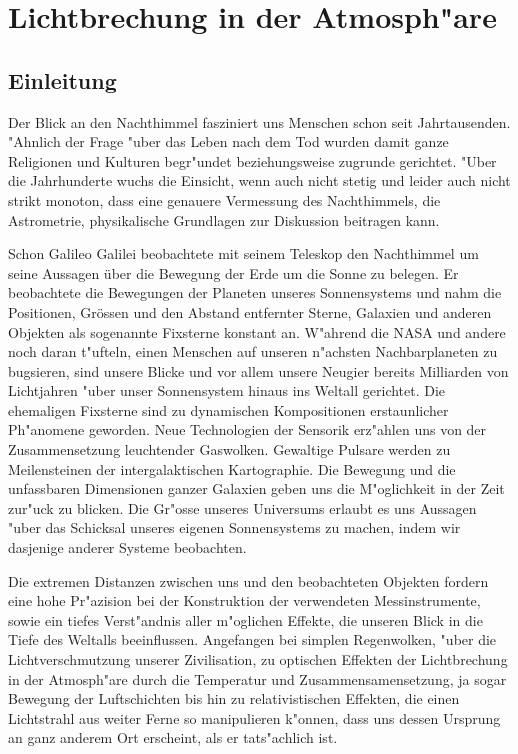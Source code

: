 \chapter{Lichtbrechung in der Atmosph"are\label{chapter:licht}}
\begin{refsection}


\section{Einleitung}

Der Blick an den Nachthimmel fasziniert uns Menschen schon seit Jahrtausenden. "Ahnlich der Frage "uber das Leben nach dem Tod wurden damit ganze Religionen und Kulturen begr"undet beziehungsweise zugrunde gerichtet. 
"Uber die Jahrhunderte wuchs die Einsicht, wenn auch nicht stetig und leider auch nicht strikt monoton, dass eine genauere Vermessung des Nachthimmels, die Astrometrie, physikalische Grundlagen zur Diskussion beitragen kann. 


Schon Galileo Galilei beobachtete mit seinem Teleskop den Nachthimmel um seine Aussagen über die Bewegung der Erde um die Sonne zu belegen.
Er beobachtete die Bewegungen der Planeten unseres Sonnensystems und nahm die Positionen, Grössen und den Abstand entfernter Sterne, Galaxien und anderen Objekten als sogenannte Fixsterne konstant an. 
W"ahrend die NASA und andere noch daran t"ufteln, einen Menschen auf unseren n"achsten Nachbarplaneten zu bugsieren, sind unsere Blicke und vor allem unsere Neugier bereits Milliarden von Lichtjahren "uber unser Sonnensystem hinaus ins Weltall gerichtet. 
Die ehemaligen Fixsterne sind zu dynamischen Kompositionen erstaunlicher Ph"anomene geworden.
Neue Technologien der Sensorik erz"ahlen uns von der Zusammensetzung leuchtender Gaswolken. 
Gewaltige Pulsare werden zu Meilensteinen der intergalaktischen Kartographie. 
Die Bewegung und die unfassbaren Dimensionen ganzer Galaxien geben uns die M"oglichkeit in der Zeit zur"uck zu blicken.
Die Gr"osse unseres Universums  erlaubt es uns Aussagen "uber das Schicksal unseres eigenen Sonnensystems zu machen, indem wir dasjenige anderer Systeme beobachten. 


Die extremen Distanzen zwischen uns und den beobachteten Objekten fordern eine hohe Pr"azision bei der Konstruktion der verwendeten Messinstrumente, sowie ein tiefes Verst"andnis aller m"oglichen Effekte, die unseren Blick in die Tiefe des Weltalls beeinflussen. 
Angefangen bei simplen Regenwolken, "uber die Lichtverschmutzung unserer Zivilisation, zu optischen Effekten der Lichtbrechung in der Atmosph"are durch die Temperatur und Zusammensamensetzung, ja sogar Bewegung der Luftschichten bis hin zu relativistischen Effekten, die einen Lichtstrahl aus weiter Ferne so manipulieren k"onnen, dass uns dessen Ursprung an ganz anderem Ort erscheint, als er tats"achlich ist. 



\end{refsection}
